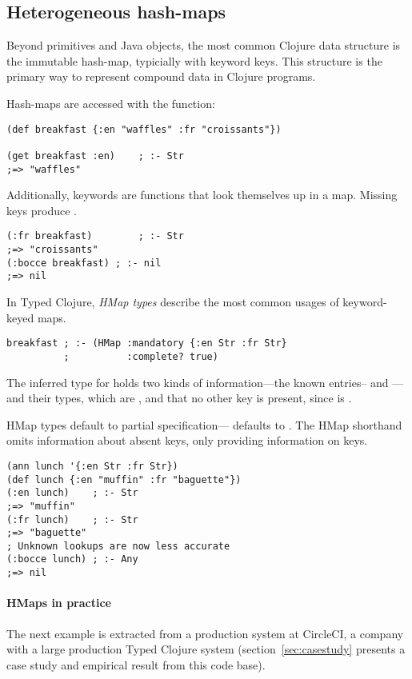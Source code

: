 \subsection{Heterogeneous hash-maps}

Beyond primitives and Java objects, the most common Clojure data
structure is the 
immutable hash-map, typicially with keyword keys. This structure is
the primary way to represent compound data in Clojure programs.

Hash-maps are accessed with the  function:
\begin{verbatim}
(def breakfast {:en "waffles" :fr "croissants"})

(get breakfast :en)    ; :- Str
;=> "waffles"
\end{verbatim}
Additionally, keywords are functions that look themselves up in a
map. Missing keys produce .
\begin{verbatim}
(:fr breakfast)        ; :- Str
;=> "croissants"
(:bocce breakfast) ; :- nil
;=> nil
\end{verbatim}

In Typed Clojure, \emph{HMap types} describe the most common usages of
keyword-keyed maps.
\begin{verbatim}
breakfast ; :- (HMap :mandatory {:en Str :fr Str}
          ;          :complete? true)
\end{verbatim}
The inferred type for  holds two kinds of information---the known entries--
and ---and their types, which are  , and that 
no other key is present, since  is .

HMap types default to  partial specification--- defaults to . The HMap shorthand 
omits
information about absent keys, only providing information on
 keys.

\begin{verbatim}
(ann lunch '{:en Str :fr Str})
(def lunch {:en "muffin" :fr "baguette"})
(:en lunch)    ; :- Str
;=> "muffin"
(:fr lunch)    ; :- Str
;=> "baguette"
; Unknown lookups are now less accurate
(:bocce lunch) ; :- Any
;=> nil
\end{verbatim}

\paragraph{HMaps in practice} The next example is extracted from a production system at CircleCI,
a company with a large production Typed Clojure system
(section~\ref{sec:casestudy} presents a case study and empirical
result from this code base).

